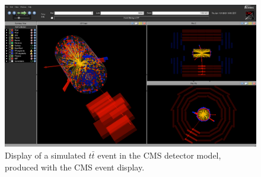  \begin{figure}
  \centering
  \includegraphics[width=1.0\textwidth]{03_simulation/plots/eventDisplay-39649-11661467.png}
  \caption{Display of a simulated $t\bar{t}$ event in the CMS detector model, produced with the CMS event display.}
  \label{fig:Evt_display}
 \end{figure}